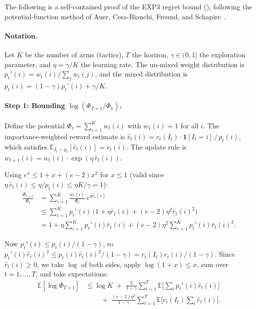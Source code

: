 \documentclass[conference]{IEEEtran}
\begin{document}
The following is a self-contained proof of the EXP3 regret bound
(), following the potential-function method of
Auer, Cesa-Bianchi, Freund, and
Schapire~\cite{AuerCesaBianchiFreundSchapire2002}.

\paragraph{Notation.}  Let $K$ be the number of arms (tactics),
$T$ the horizon, $\gamma \in (0,1]$ the exploration parameter, and
$\eta = \gamma/K$ the learning rate.  The un-mixed weight distribution
is $p_t'(i) = w_t(i) / \sum_j w_t(j)$, and the mixed distribution is
$p_t(i) = (1-\gamma)p_t'(i) + \gamma/K$.

\paragraph{Step 1: Bounding $\log(\Phi_{T+1}/\Phi_1)$.}
Define the potential $\Phi_t = \sum_{i=1}^{K} w_t(i)$ with
$w_1(i) = 1$ for all $i$.
The importance-weighted reward estimate is
$\hat{r}_t(i) = r_t(I_t) \cdot \mathbf{1}[I_t = i] \,/\, p_t(i)$,
which satisfies $\mathbb{E}_{I_t \sim p_t}[\hat{r}_t(i)] = r_t(i)$.
The update rule is $w_{t+1}(i) = w_t(i) \cdot \exp(\eta\, \hat{r}_t(i))$.

Using $e^x \le 1 + x + (e-2)x^2$ for $x \le 1$ (valid since
$\eta\,\hat{r}_t(i) \le \eta / p_t(i) \le \eta K / \gamma = 1$):
\begin{align}
  \frac{\Phi_{t+1}}{\Phi_t}
  &= \sum_{i=1}^{K} \frac{w_t(i)}{\Phi_t}\, e^{\eta \hat{r}_t(i)}
    \nonumber \\
  &\le \sum_{i=1}^{K} p_t'(i)\,
      \bigl(1 + \eta\hat{r}_t(i) + (e-2)\eta^2\hat{r}_t(i)^2\bigr)
    \nonumber \\
  &= 1 + \eta\sum_{i=1}^{K} p_t'(i)\hat{r}_t(i)
      + (e-2)\eta^2\sum_{i=1}^{K} p_t'(i)\hat{r}_t(i)^2.
    \label{eq:exp3-phi-ratio}
\end{align}

Now $p_t'(i) \le p_t(i)/(1-\gamma)$, so
$p_t'(i)\hat{r}_t(i)^2 \le p_t(i)\hat{r}_t(i)^2/(1-\gamma)
  = r_t(I_t)\hat{r}_t(i)/(1-\gamma)$.
Since $\hat{r}_t(i) \ge 0$, we take $\log$ of both sides,
apply $\log(1+x) \le x$, sum over $t=1,\dots,T$, and take expectations:
\begin{align}
  \mathbb{E}[\log\Phi_{T+1}]
  &\le \log K \;+\;
     \frac{\eta}{1-\gamma} \sum_{t=1}^{T} \mathbb{E}\bigl[
       \textstyle\sum_i p_t'(i)\hat{r}_t(i)
     \bigr] \nonumber \\
  &\qquad\;+\; \frac{(e-2)\eta^2}{1-\gamma} \sum_{t=1}^{T}
     \mathbb{E}\bigl[r_t(I_t)\textstyle\sum_i \hat{r}_t(i)\bigr].
  \label{eq:exp3-log-phi}
\end{align}
\end{document}

